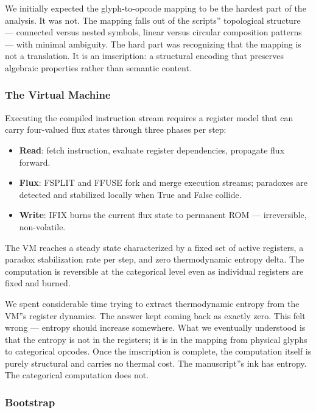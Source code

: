\documentclass[12pt,a4paper]{article}
\begin{document}
We initially expected the glyph-to-opcode mapping to be the hardest part of the analysis. It was not. The mapping falls out of the scripts'' topological structure --- connected versus nested symbols, linear versus circular composition patterns --- with minimal ambiguity. The hard part was recognizing that the mapping is not a translation. It is an imscription: a structural encoding that preserves algebraic properties rather than semantic content.

\subsubsection{The Virtual Machine}

Executing the compiled instruction stream requires a register model that can carry four-valued flux states through three phases per step:

\begin{itemize}
    \item \textbf{Read}: fetch instruction, evaluate register dependencies, propagate flux forward.
    \item \textbf{Flux}: FSPLIT and FFUSE fork and merge execution streams; paradoxes are detected and stabilized locally when True and False collide.
    \item \textbf{Write}: IFIX burns the current flux state to permanent ROM --- irreversible, non-volatile.
\end{itemize}

The VM reaches a steady state characterized by a fixed set of active registers, a paradox stabilization rate per step, and zero thermodynamic entropy delta. The computation is reversible at the categorical level even as individual registers are fixed and burned.

We spent considerable time trying to extract thermodynamic entropy from the VM''s register dynamics. The answer kept coming back as exactly zero. This felt wrong --- entropy should increase somewhere. What we eventually understood is that the entropy is not in the registers; it is in the mapping from physical glyphs to categorical opcodes. Once the imscription is complete, the computation itself is purely structural and carries no thermal cost. The manuscript''s ink has entropy. The categorical computation does not.

\subsubsection{Bootstrap}
\end{document}
